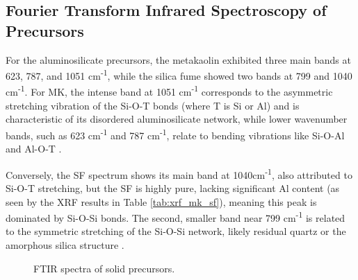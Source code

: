 \subsection{Fourier Transform Infrared Spectroscopy of Precursors}

For the aluminosilicate precursors, the metakaolin exhibited three main bands at 623, 787, and 1051 cm\textsuperscript{-1}, while the silica fume showed two bands at 799 and 1040 cm\textsuperscript{-1}.
For MK, the intense band at 1051 cm\textsuperscript{-1} corresponds to the asymmetric stretching vibration of the Si-O-T bonds (where T is Si or Al) and is characteristic of its disordered aluminosilicate network, while lower wavenumber bands, such as 623 cm\textsuperscript{-1} and 787 cm\textsuperscript{-1}, relate to bending vibrations like Si-O-Al and Al-O-T \cite{moraes2024scsa}.

Conversely, the SF spectrum shows its main band at 1040cm\textsuperscript{-1}, also attributed to Si-O-T stretching, but the SF is highly pure, lacking significant Al content (as seen by the XRF results in Table \ref{tab:xrf_mk_sf}), meaning this peak is dominated by Si-O-Si bonds.
The second, smaller band near 799 cm\textsuperscript{-1} is related to the symmetric stretching of the Si-O-Si network, likely residual quartz or the amorphous silica structure \cite{ma2022calcium}.

\begin{figure}[H]
    \centering
    \caption{FTIR spectra of solid precursors.}
    \label{fig:ftir_precursors}
\end{figure}

